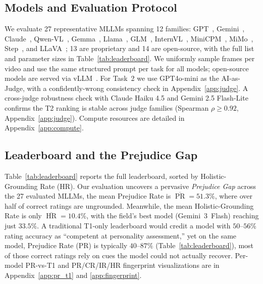 \documentclass{llmxive}
\providecommand{\gapinv}{Prejudice Gap}
\begin{document}
\subsection{Models and Evaluation Protocol}
\label{sec:setup}

We evaluate 27 representative MLLMs spanning 12 families: GPT~\cite{openai2023gpt4,openai2024gpt4o,openai2025gpt5,openai2025gpt55,openai2025gpt54,openai2025gpt54mini,openai2025o4mini}, Gemini~\cite{anil2023gemini,reid2024gemini15,comanici2025gemini,google2025gemini3,google2025gemini3flash,google2025gemini31pro}, Claude~\cite{anthropic2024claude3,anthropic2025claudeopus46,anthropic2025claudesonnet46,anthropic2025claudehaiku45}, Qwen-VL~\cite{bai2023qwen,wang2024qwen2vl,bai2025qwen25vl,xu2025qwen3,qwen2025qwen3}, Gemma~\cite{deepmind2025gemma4}, Llama~\cite{meta2025llama4maverick}, GLM~\cite{glm2024chatglm,hong2025glm}, InternVL~\cite{chen2024internvl}, MiniCPM~\cite{yao2024minicpmv}, MiMo~\cite{li2025mimo}, Step~\cite{huang2026step3vl}, and LLaVA~\cite{liu2023llava,liu2024llava15}; 13 are proprietary and 14 are open-source, with the full list and parameter sizes in Table~\ref{tab:leaderboard}. We uniformly sample frames per video and use the same structured prompt per task for all models; open-source models are served via vLLM~\cite{kwon2023vllm}. For Task~2 we use GPT4o-mini as the AI-as-Judge, with a confidently-wrong consistency check in Appendix~\ref{app:judge}. A cross-judge robustness check with Claude Haiku 4.5 and Gemini 2.5 Flash-Lite confirms the T2 ranking is stable across judge families (Spearman $\rho \geq 0.92$, Appendix~\ref{app:judge}). Compute resources are detailed in Appendix~\ref{app:compute}.

\subsection{Leaderboard and the Prejudice Gap}
\label{sec:leaderboard}\label{sec:gap_inversion}

Table~\ref{tab:leaderboard} reports the full leaderboard, sorted by Holistic-Grounding Rate (HR). Our evaluation uncovers a pervasive \emph{\gapinv{}} across the 27 evaluated MLLMs, the mean Prejudice Rate is $\overline{\operatorname{PR}}\!=\!51.3\%$, where over half of correct ratings are ungrounded. Meanwhile, the mean Holistic-Grounding Rate is only $\overline{\operatorname{HR}}\!=\!10.4\%$, with the field's best model (Gemini~3~Flash) reaching just $33.5\%$. A traditional T1-only leaderboard would credit a model with $50$--$56\%$ rating accuracy as ``competent at personality assessment,'' yet on the same model, Prejudice Rate (PR) is typically $40$--$87\%$ (Table~\ref{tab:leaderboard}), most of those correct ratings rely on cues the model could not actually recover. Per-model PR-vs-T1 and PR/CR/IR/HR fingerprint visualizations are in Appendix~\ref{app:pr_t1} and \ref{app:fingerprint}.
\end{document}
